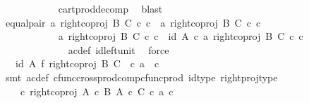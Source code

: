 \begin{isabellebody}
\ \ \ \ \ \ \ \ \ \ \isamarkupfalse%
\ cart{\isacharunderscore}{\kern0pt}prod{\isacharunderscore}{\kern0pt}decomp\ \isamarkupfalse%
\ blast\isanewline
\ \ \ \ \ \ \ \ \isamarkupfalse%
\ equal{\isacharunderscore}{\kern0pt}pair{\isacharcolon}{\kern0pt}\ {\isachardoublequoteopen}{\isasymlangle}a{\isacharcomma}{\kern0pt}\ right{\isacharunderscore}{\kern0pt}coproj\ B\ C\ {\isasymcirc}\isactrlsub c\ c{\isasymrangle}\ {\isacharequal}{\kern0pt}\ {\isasymlangle}a{\isacharprime}{\kern0pt}{\isacharcomma}{\kern0pt}\ right{\isacharunderscore}{\kern0pt}coproj\ B\ C\ {\isasymcirc}\isactrlsub c\ c{\isacharprime}{\kern0pt}{\isasymrangle}{\isachardoublequoteclose}\isanewline
\ \ \ \ \ \ \ \ \isamarkupfalse%
\ {\isacharminus}{\kern0pt}\ \isanewline
\ \ \ \ \ \ \ \ \ \ \isamarkupfalse%
\ {\isachardoublequoteopen}{\isasymlangle}a{\isacharcomma}{\kern0pt}\ right{\isacharunderscore}{\kern0pt}coproj\ B\ C\ {\isasymcirc}\isactrlsub c\ c{\isasymrangle}\ {\isacharequal}{\kern0pt}\ {\isasymlangle}id\ A\ {\isasymcirc}\isactrlsub c\ a{\isacharcomma}{\kern0pt}\ right{\isacharunderscore}{\kern0pt}coproj\ B\ C\ {\isasymcirc}\isactrlsub c\ c{\isasymrangle}{\isachardoublequoteclose}\isanewline
\ \ \ \ \ \ \ \ \ \ \ \ \isamarkupfalse%
\ ac{\isacharunderscore}{\kern0pt}def\ id{\isacharunderscore}{\kern0pt}left{\isacharunderscore}{\kern0pt}unit{}\ \isamarkupfalse%
\ force\isanewline
\ \ \ \ \ \ \ \ \ \ \isamarkupfalse%
\ \isamarkupfalse%
\ {\isachardoublequoteopen}{\isachardot}{\kern0pt}{\isachardot}{\kern0pt}{\isachardot}{\kern0pt}\ {\isacharequal}{\kern0pt}\ {\isacharparenleft}{\kern0pt}id\ A\ {\isasymtimes}\isactrlsub f\ right{\isacharunderscore}{\kern0pt}coproj\ B\ C{\isacharparenright}{\kern0pt}\ \ {\isasymcirc}\isactrlsub c\ {\isasymlangle}a{\isacharcomma}{\kern0pt}\ \ c{\isasymrangle}{\isachardoublequoteclose}\isanewline
\ \ \ \ \ \ \ \ \ \ \ \ \isamarkupfalse%
\ {\isacharparenleft}{\kern0pt}smt\ ac{\isacharunderscore}{\kern0pt}def\ cfunc{\isacharunderscore}{\kern0pt}cross{\isacharunderscore}{\kern0pt}prod{\isacharunderscore}{\kern0pt}comp{\isacharunderscore}{\kern0pt}cfunc{\isacharunderscore}{\kern0pt}prod\ id{\isacharunderscore}{\kern0pt}type\ right{\isacharunderscore}{\kern0pt}proj{\isacharunderscore}{\kern0pt}type{\isacharparenright}{\kern0pt}\isanewline
\ \ \ \ \ \ \ \ \ \ \isamarkupfalse%
\ \isamarkupfalse%
\ {\isachardoublequoteopen}{\isachardot}{\kern0pt}{\isachardot}{\kern0pt}{\isachardot}{\kern0pt}\ {\isacharequal}{\kern0pt}\ {\isacharparenleft}{\kern0pt}{\isasymphi}\ {\isasymcirc}\isactrlsub c\ right{\isacharunderscore}{\kern0pt}coproj\ {\isacharparenleft}{\kern0pt}A\ {\isasymtimes}\isactrlsub c\ B{\isacharparenright}{\kern0pt}\ {\isacharparenleft}{\kern0pt}A\ {\isasymtimes}\isactrlsub c\ C{\isacharparenright}{\kern0pt}{\isacharparenright}{\kern0pt}\ {\isasymcirc}\isactrlsub c\ {\isasymlangle}a{\isacharcomma}{\kern0pt}\ c{\isasymrangle}{\isachardoublequoteclose}\isanewline

\end{isabellebody}
